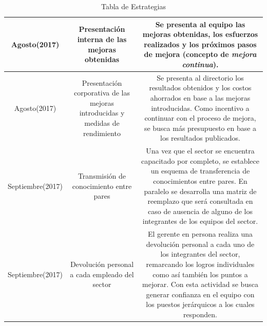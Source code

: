 \begin{table}
{\begin{tabular}{|c|c|c|}
Agosto(2017)                                                                                                            & Presentación interna de las mejoras obtenidas                                                             & Se presenta al equipo las mejoras obtenidas, los esfuerzos realizados y los próximos pasos de mejora (concepto de \textit{mejora continua}).                                                                                                                                                                     \\ \hline
Agosto(2017)                                                                                                            & Presentación corporativa de las mejoras introducidas y medidas de rendimiento                            & Se presenta al directorio los resultados obtenidos y los costos ahorrados en base a las mejoras introducidas. Como incentivo a continuar con el proceso de mejora, se busca más presupuesto en base a los resultados publicados.                                                                        \\ \hline
Septiembre(2017)                                                                                                        & Transmisión de conocimiento entre pares                                                                  & Una vez que el sector se encuentra capacitado por completo, se establece un esquema de transferencia de conocimientos entre pares. En paralelo se desarrolla una matriz de reemplazo que será consultada en caso de ausencia de alguno de los integrantes de los equipos del sector.                   \\ \hline
Septiembre(2017)                                                                                                        & Devolución personal a cada empleado del sector                                                           & El gerente en persona realiza una devolución personal a cada uno de los integrantes del sector, remarcando los logros individuales como así también los puntos a mejorar. Con esta actividad se busca generar confianza en el equipo con los puestos jerárquicos a los cuales responden.               \\ \hline
\end{tabular}
}
\caption{Tabla de Estrategias}
\label{estrategias}
\end{table}
